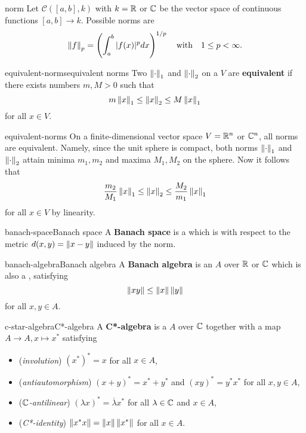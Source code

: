 \begin{example}{norm}
    Let $\mathcal{C}([a, b], k)$ with $k = \mathbb{R}$ or $\mathbb{C}$ be the vector space of continuous functions $[a, b] \to k$. Possible norms are
    \[ \left\|f\right\|_p = \left(\int_a^b |f(x)|^p d x \right)^{1/p} \quad \text{with} \quad 1 \le p < \infty . \]
\end{example}

\begin{topic}{equivalent-norms}{equivalent norms}
    Two  $\left\|\cdot\right\|_1$ and $\left\|\cdot\right\|_2$ on a  $V$ are \textbf{equivalent} if there exists numbers $m, M > 0$ such that
    \[ m \left\|x\right\|_1 \le \left\|x\right\|_2 \le M \left\|x\right\|_1 \]
    for all $x \in V$.
\end{topic}

\begin{example}{equivalent-norms}
    On a finite-dimensional vector space $V = \mathbb{R}^n$ or $\mathbb{C}^n$, all norms are equivalent. Namely, since the unit sphere is compact, both norms $\left\|\cdot\right\|_1$ and $\left\|\cdot\right\|_2$ attain minima $m_1, m_2$ and maxima $M_1, M_2$ on the sphere. Now it follows that
    \[ \frac{m_2}{M_1} \left\|x\right\|_1 \le \left\|x\right\|_2 \le \frac{M_2}{m_1} \left\|x\right\|_1 \]
    for all $x \in V$ by linearity.
\end{example}

\begin{topic}{banach-space}{Banach space}
    A \textbf{Banach space} is a   which is  with respect to the metric $d(x, y) = \left\|x - y\right\|$ induced by the norm.
\end{topic}

\begin{topic}{banach-algebra}{Banach algebra}
    A \textbf{Banach algebra} is an  $A$ over $\mathbb{R}$ or $\mathbb{C}$ which is also a , satisfying
    \[ \left\|xy\right\| \le \left\|x\right\| \left\|y\right\| \]
    for all $x, y \in A$.
\end{topic}

\begin{topic}{c-star-algebra}{C*-algebra}
    A \textbf{C*-algebra} is a  $A$ over $\mathbb{C}$ together with a map $A \to A, x \mapsto x^*$ satisfying
    \begin{itemize}
        \item (\textit{involution}) $(x^*)^* = x$ for all $x \in A$,
        \item (\textit{antiautomorphism}) $(x + y)^* = x^* + y^*$ and $(xy)^* = y^* x^*$ for all $x, y \in A$,
        \item (\textit{$\mathbb{C}$-antilinear}) $(\lambda x)^* = \overline{\lambda} x^*$ for all $\lambda \in \mathbb{C}$ and $x \in A$,
        \item (\textit{C*-identity}) $\left\|x^* x\right\| = \left\|x\right\| \left\|x^*\right\|$ for all $x \in A$.
    \end{itemize}
\end{topic}


